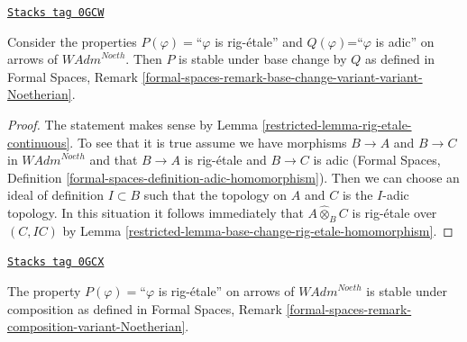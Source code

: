 \begin{lemma}
\label{restricted-lemma-base-change-rig-etale-continuous}
\href{https://stacks.math.columbia.edu/tag/0GCW}{\texttt{Stacks tag 0GCW}}

Consider the properties $P(\varphi)=$``$\varphi$ is rig-\'etale''
and $Q(\varphi)$=``$\varphi$ is adic'' on arrows of $\textit{WAdm}^{Noeth}$.
Then $P$ is stable under base change by $Q$ as defined in
Formal Spaces, Remark
\ref{formal-spaces-remark-base-change-variant-variant-Noetherian}.
\end{lemma}

\begin{proof}

The statement makes sense by Lemma \ref{restricted-lemma-rig-etale-continuous}.
To see that it is true assume we have morphisms
$B \to A$ and $B \to C$ in $\textit{WAdm}^{Noeth}$
and that $B \to A$ is rig-\'etale and $B \to C$ is adic
(Formal Spaces, Definition
\ref{formal-spaces-definition-adic-homomorphism}).
Then we can choose an ideal of definition $I \subset B$
such that the topology on $A$ and $C$ is the $I$-adic topology.
In this situation it follows immediately that
$A \widehat{\otimes}_B C$ is rig-\'etale over $(C, IC)$ by
Lemma \ref{restricted-lemma-base-change-rig-etale-homomorphism}.
\end{proof}

\begin{lemma}
\label{restricted-lemma-composition-rig-etale-continuous}
\href{https://stacks.math.columbia.edu/tag/0GCX}{\texttt{Stacks tag 0GCX}}

The property $P(\varphi)=$``$\varphi$ is rig-\'etale''
on arrows of $\textit{WAdm}^{Noeth}$ is stable under composition
as defined in Formal Spaces, Remark
\ref{formal-spaces-remark-composition-variant-Noetherian}.
\end{lemma}

